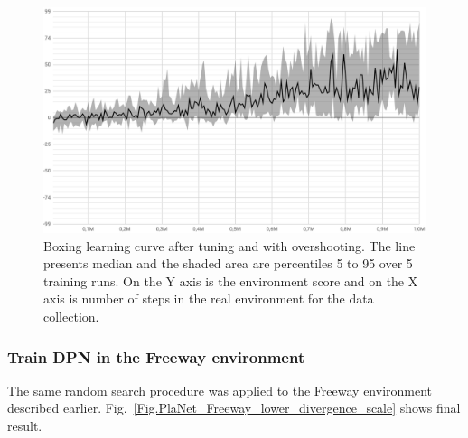 \begin{figure}[H]
\includegraphics[width=1\textwidth,keepaspectratio]{figures/PlaNet/Boxing_with_overshooting.png}
\caption[Boxing learning curve after tuning and with overshooting]{Boxing learning curve after tuning and with overshooting. The line presents median and the shaded area are percentiles 5 to 95 over 5 training runs. On the Y axis is the environment score and on the X axis is number of steps in the real environment for the data collection.}
\label{Fig.Boxing_with_overshooting}
\end{figure}

\subsubsection{Train DPN in the Freeway environment}

The same random search procedure was applied to the Freeway environment described earlier. Fig.~\ref{Fig.PlaNet_Freeway_lower_divergence_scale} shows final result.

